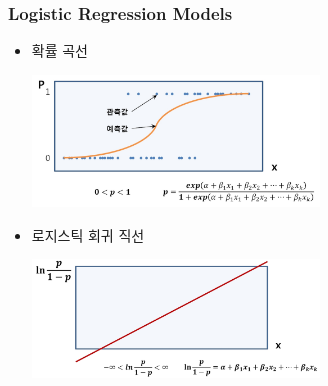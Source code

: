 \documentclass[10pt,xcolor={svgnames},t]{beamer}
\begin{document}
%
\begin{frame}
	\frametitle{Logistic Regression Models}
	
	\begin{itemize}
		\item 확률 곡선
		\begin{center}
			\includegraphics[width=0.6\textwidth]{lo4.jpg}
		\end{center}
	\item 로지스틱 회귀 직선
				\begin{center}
					\includegraphics[width=0.6\textwidth]{lo5.jpg}
				\end{center}
		
	\end{itemize}
	
	
\end{frame}
%
\end{document}
